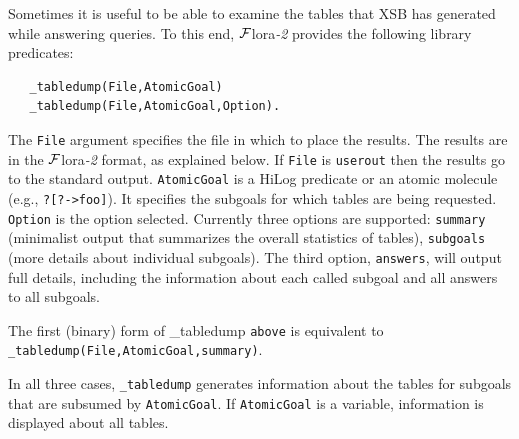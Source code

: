 \documentclass[11pt]{article}
\newcommand{\FLORA}{{\mbox{\sc ${\cal F}${lora}\rm\emph{-2}}}\xspace}
\begin{document}
Sometimes it is useful to be able to examine the tables that XSB has
generated while answering queries. To this end, \FLORA provides 
the following library predicates:
\begin{verbatim}
   _tabledump(File,AtomicGoal)
   _tabledump(File,AtomicGoal,Option).
\end{verbatim}
The \texttt{File} argument specifies the file in which to place the results.
The results are in the \FLORA format, as explained below.
If \texttt{File} is \texttt{userout} then the results go to the standard
output.  \texttt{AtomicGoal} is a HiLog predicate or an atomic molecule
(e.g., \texttt{?[?->foo]}).
It specifies the subgoals for which tables are
being requested.
\texttt{Option} is the option selected. Currently three options are
supported:
\texttt{summary} (minimalist output that summarizes the overall statistics
of tables), \texttt{subgoals} (more details about individual subgoals). The
third option, \texttt{answers},
will output full details, including the information about each called subgoal
and all answers to all
subgoals.

The first (binary) form of \_tabledump \texttt{above} is equivalent to
\texttt{\_tabledump(File,AtomicGoal,summary)}. 

In all three cases, \texttt{\_tabledump} generates information
about the tables for subgoals that are subsumed by \texttt{AtomicGoal}. If
\texttt{AtomicGoal} is a variable, information is displayed about all
tables.   
\end{document}
